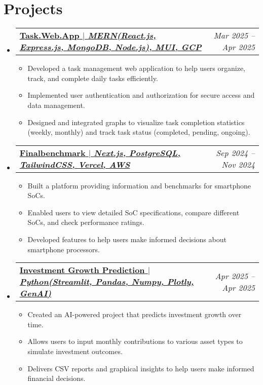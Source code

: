 \documentclass[letterpaper,11pt]{article}
\makeatletter
\newcommand{\resumeItem}[1]{
  \item\small{ %
    {#1 \vspace{-2pt}}
  }
}
\newcommand{\resumeProjectHeading}[2]{
    \item
    \begin{tabular*}{0.97\textwidth}{l@{\extracolsep{\fill}}r}
      \textbf{#1} & \textit{\small #2} \\ %
    \end{tabular*}\vspace{-7pt}
}
\newcommand{\resumeSubHeadingListStart}{\begin{itemize}[leftmargin=0.15in, label={}]}
\newcommand{\resumeSubHeadingListEnd}{\end{itemize}}
\newcommand{\resumeItemListStart}{\begin{itemize}}
\newcommand{\resumeItemListEnd}{\end{itemize}\vspace{-5pt}}
\makeatother
\begin{document}
\section{Projects}
\resumeSubHeadingListStart
\resumeProjectHeading{%
  \href{https://github.com/abhay-byte/task_management_tool}{%
    {\small\textbf{Task.Web.App} $|$ \emph{MERN(React.js, Express.js, MongoDB, Node.js), MUI, GCP}}%
  }%
}{Mar 2025 -- Apr 2025}
      \resumeItemListStart
        \resumeItem{Developed a task management web application to help users organize, track, and complete daily tasks efficiently.} %
        \resumeItem{Implemented user authentication and authorization for secure access and data management.} %
        \resumeItem{Designed and integrated graphs to visualize task completion statistics (weekly, monthly) and track task status (completed, pending, ongoing).} %
      \resumeItemListEnd
\resumeProjectHeading{%
  \href{https://github.com/abhay-byte/fb_nextjs}{%
    {\small\textbf{Finalbenchmark} $|$ \emph{Next.js, PostgreSQL, TailwindCSS, Vercel, AWS}}%
  }%
}{Sep 2024 -- Nov 2024} %
      \resumeItemListStart
        \resumeItem{Built a platform providing information and benchmarks for smartphone SoCs.} %
        \resumeItem{Enabled users to view detailed SoC specifications, compare different SoCs, and check performance ratings.} %
        \resumeItem{Developed features to help users make informed decisions about smartphone processors.} %
      \resumeItemListEnd
\resumeProjectHeading{%
  \href{https://aiwrapper.streamlit.app/}{%
    {\small\textbf{Investment Growth Prediction} $|$ \emph{Python(Streamlit, Pandas, Numpy, Plotly, GenAI)}}%
  }%
}{Apr 2025 -- Apr 2025} %
      \resumeItemListStart
        \resumeItem{Created an AI-powered project that predicts investment growth over time.} %
        \resumeItem{Allows users to input monthly contributions to various asset types to simulate investment outcomes.} %
        \resumeItem{Delivers CSV reports and graphical insights to help users make informed financial decisions.} %
      \resumeItemListEnd
\resumeSubHeadingListEnd


\end{document}
